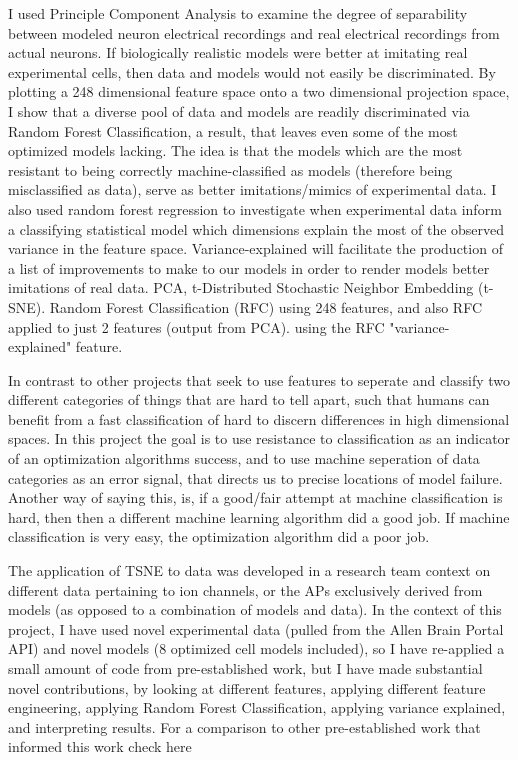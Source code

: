 I used Principle Component Analysis to examine the degree of separability between modeled neuron electrical recordings and real electrical recordings from actual neurons.\newline
\newline
If biologically realistic models were better at imitating real experimental cells, then data and models would not easily be discriminated. By plotting a 248 dimensional feature space onto a two dimensional projection space, I show that a diverse pool of data and models are readily discriminated via Random Forest Classification, a result, that leaves even some of the most optimized models lacking. The idea is that the models which are the most resistant to being correctly machine-classified as models (therefore being misclassified as data), serve as better imitations/mimics of experimental data. I also used random forest regression to investigate when experimental data inform a classifying statistical model which dimensions explain the most of the observed variance in the feature space. Variance-explained will facilitate the production of a list of improvements to make to our models in order to render models better imitations of real data.\newline
\newline
PCA, t-Distributed Stochastic Neighbor Embedding (t-SNE).
Random Forest Classification (RFC) using 248 features, and also RFC applied to just 2 features (output from PCA).
using the RFC "variance-explained" feature.

In contrast to other projects that seek to use features to seperate and classify two different categories of things that are hard to tell apart, such that humans can benefit from a fast classification of hard to discern differences in high dimensional spaces. In this project the goal is to use resistance to classification as an indicator of an optimization algorithms success, and to use machine seperation of data categories as an error signal, that directs us to precise locations of model failure. Another way of saying this, is, if a good/fair attempt at machine classification is hard, then then a different machine learning algorithm did a good job. If machine classification is very easy, the optimization algorithm did a poor job.

The application of TSNE to data was developed in a research team context on different data pertaining to ion channels, or the APs exclusively derived from models (as opposed to a combination of models and data). In the context of this project, I have used novel experimental data (pulled from the Allen Brain Portal API) and novel models (8 optimized cell models included), so I have re-applied a small amount of code from pre-established work, but I have made substantial novel contributions, by looking at different features, applying different feature engineering, applying Random Forest Classification, applying variance explained, and interpreting results. For a comparison to other pre-established work that informed this work check here

